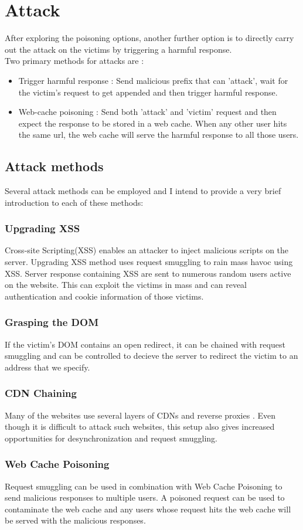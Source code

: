 \section{Attack}
After exploring the poisoning options, another further option is to directly carry out the attack on the victims by triggering a harmful response. \\
Two primary methods for attacks are :
\begin{itemize}
	\item Trigger harmful response : Send malicious prefix that can 'attack', wait for the victim's request to get appended and then trigger harmful response. 
	\item Web-cache poisoning : Send both 'attack' and 'victim' request and then expect the response to be stored in a web cache. When any other user hits the same url, the web cache will serve the harmful response to all those users. 
\end{itemize}

\subsection{Attack methods}
Several attack methods can be employed and I intend to provide a very brief introduction to each of these methods:
\subsubsection{Upgrading XSS}
Cross-site Scripting(XSS) \cite{b11} enables an attacker to inject malicious scripts on the server. Upgrading XSS method uses request smuggling to rain mass havoc using XSS. Server response containing XSS are sent to numerous random users active on the website. This can exploit the victims in mass and can reveal authentication and cookie information of those victims.  
\subsubsection{Grasping the DOM}
If the victim's DOM contains an open redirect, it can be chained with request smuggling and can be controlled to decieve the server to redirect the victim to an address that we specify.  
\subsubsection{CDN Chaining}
Many of the websites use several layers of CDNs \cite{b12} and reverse proxies \cite{b13}. Even though it is difficult to attack such websites, this setup also gives increased opportunities for desynchronization and request smuggling.
\subsubsection{Web Cache Poisoning}
Request smuggling can be used in combination with Web Cache Poisoning \cite{b14} to send malicious responses to multiple users. A poisoned request can be used to contaminate the web cache and any users whose request hits the web cache will be served with the malicious responses. \\

